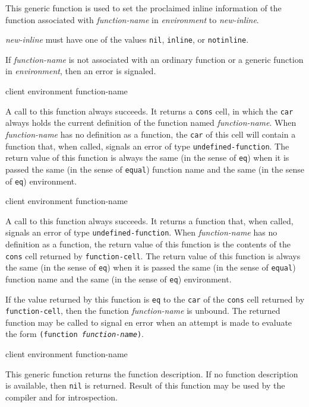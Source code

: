 This generic function is used to set the proclaimed inline information
of the function associated with \textit{function-name} in
\textit{environment} to \textit{new-inline}.

\textit{new-inline} must have one of the values \texttt{nil},
\texttt{inline}, or \texttt{notinline}.

If \textit{function-name} is not associated with an ordinary function
or a generic function in \textit{environment}, then an error is
signaled.

 {client environment function-name}

A call to this function always succeeds.  It returns a \texttt{cons}
cell, in which the \texttt{car} always holds the current definition of
the function named \textit{function-name}.  When
\textit{function-name} has no definition as a function, the
\texttt{car} of this cell will contain a function that, when called,
signals an error of type \texttt{undefined-function}.  The return
value of this function is always the same (in the sense of
\texttt{eq}) when it is passed the same (in the sense of
\texttt{equal}) function name and the same (in the sense of
\texttt{eq}) environment.

 {client environment function-name}

A call to this function always succeeds.  It returns a function that, when
called, signals an error of type \texttt{undefined-function}.  When
\textit{function-name} has no definition as a function, the return value of
this function is the contents of the \texttt{cons} cell returned by
\texttt{function-cell}.  The return value of this function is always the same
(in the sense of \texttt{eq}) when it is passed the same (in the sense of
\texttt{equal}) function name and the same (in the sense of \texttt{eq})
environment.

If the value returned by this function is \texttt{eq} to the \texttt{car} of
the \texttt{cons} cell returned by \texttt{function-cell}, then the function
\textit{function-name} is unbound. The returned function may be called to
signal en error when an attempt is made to evaluate the form
\texttt{(function \textrm{\textit{function-name}})}.

 {client environment function-name}

This generic function returns the function description. If no function
description is available, then \texttt{nil} is returned. Result of this
function may be used by the compiler and for introspection.

